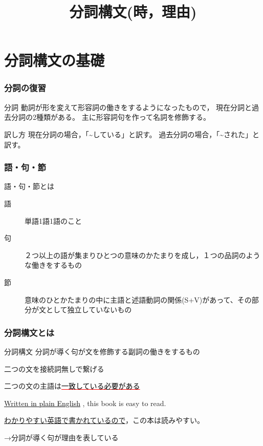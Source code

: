\documentclass[xcolor=dvipsnames,unicode,14pt]{beamer}%
\title{分詞構文(時，理由)}
\begin{document}
\frame{\maketitle}

\begin{frame}
  \tableofcontents
\end{frame}
\section{分詞構文の基礎}
\begin{frame}
  \frametitle{分詞の復習}
  \begin{block}{分詞}
    動詞が形を変えて形容詞の働きをするようになったもので，
    現在分詞と過去分詞の2種類がある。
    主に形容詞句を作って名詞を修飾する。
  \end{block}
  \begin{block}{訳し方}
    現在分詞の場合，「\textasciitilde している」と訳す。
    過去分詞の場合，「\textasciitilde された」と訳す。
  \end{block}
\end{frame}

\begin{frame}
  \frametitle{語・句・節}
  語・句・節とは
  \pause
  \begin{description}
    \item[語] 単語1語1語のこと
    \item[句] ２つ以上の語が集まりひとつの意味のかたまりを成し，１つの品詞のような働きをするもの
    \item[節] 意味のひとかたまりの中に主語と述語動詞の関係(S+V)があって、その部分が文として独立していないもの
  \end{description}
  \pause

\end{frame}
\begin{frame}
  \frametitle{分詞構文とは}

  \begin{block}{分詞構文}
    分詞が導く句が文を修飾する副詞の働きをするもの

    二つの文を接続詞無しで繋げる

    二つの文の主語は\textcolor{Red}{\underline{\textcolor{black}{一致している必要がある}}}
  \end{block} 
  \textcolor{NavyBlue}{\underline{Written \textcolor{black}{in plain English}}} , this book is easy to read. 

  \underline{わかりやすい英語で書かれているので}，この本は読みやすい。

  →分詞が導く句が理由を表している

\end{frame}
\end{document}
